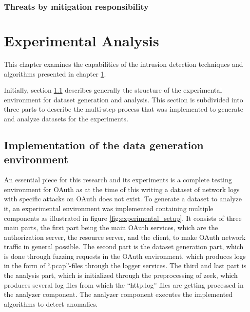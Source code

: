 \documentclass[
    fontsize=12pt,
    headings=small,
    parskip=half,           %
    bibliography=totoc,
    numbers=noenddot,       %
    open=any,               %
    ]{scrreprt}
\begin{document}
\subsection{Threats by mitigation responsibility}

\chapter{Experimental Analysis}
\label{chap:experimental_analysis}
This chapter examines the capabilities of the intrusion detection techniques and algorithms presented in chapter \ref{chap:experimental_analysis}.

Initially, section \ref{sec:exp_setup} describes generally the structure of the experimental environment for dataset generation and analysis. This section is subdivided into three parts to describe the multi-step process that was implemented to generate and analyze datasets for the experiments.

\section{Implementation of the data generation environment}
\label{sec:exp_setup}

An essential piece for this research and its experiments is a complete testing environment for OAuth as at the time of this writing a dataset of network logs with specific attacks on OAuth does not exist. To generate a dataset to analyze it, an experimental environment was implemented containing multiple components as illustrated in figure \ref{fig:experimental_setup}. It consists of three main parts, the first part being the main OAuth services, which are the authorization server, the resource server, and the client, to make OAuth network traffic in general possible. The second part is the dataset generation part, which is done through fuzzing requests in the OAuth environment, which produces logs in the form of ``.pcap''-files through the logger services. The third and last part is the analysis part, which is initialized through the preprocessing of zeek, which produces several log files from which the ``http.log'' files are getting processed in the analyzer component. The analyzer component executes the implemented algorithms to detect anomalies.
\end{document}
